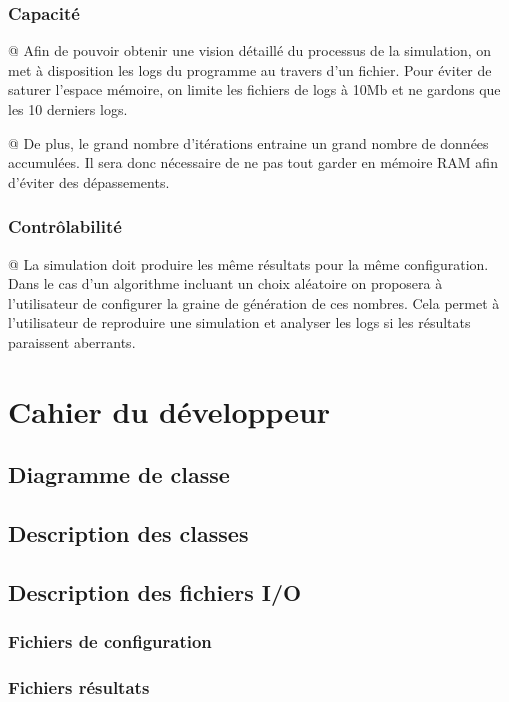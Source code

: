 \documentclass[noposter,final]{polytech/polytech}
\begin{document}
		\subsection{Capacité}
			\begin{easylist}
				@ Afin de pouvoir obtenir une vision détaillé du processus de la simulation, on met à disposition les logs du programme au travers d'un fichier.
				Pour éviter de saturer l'espace mémoire, on limite les fichiers de logs à 10Mb et ne gardons que les 10 derniers logs.
			
				@ De plus, le grand nombre d'itérations entraine un grand nombre de données accumulées.
				Il sera donc nécessaire de ne pas tout garder en mémoire RAM afin d'éviter des dépassements.
			\end{easylist}

		\subsection{Contrôlabilité}
			\begin{easylist}
				@ La simulation doit produire les même résultats pour la même configuration.
				Dans le cas d'un algorithme incluant un choix aléatoire on proposera à l'utilisateur de configurer la graine de génération de ces nombres.
				Cela permet à l'utilisateur de reproduire une simulation et analyser les logs si les résultats paraissent aberrants.
			\end{easylist}
					
\chapter{Cahier du développeur}
	\section{Diagramme de classe}
	\section{Description des classes}
	\section{Description des fichiers I/O}
		\subsection{Fichiers de configuration}
		\subsection{Fichiers résultats}
\end{document}

